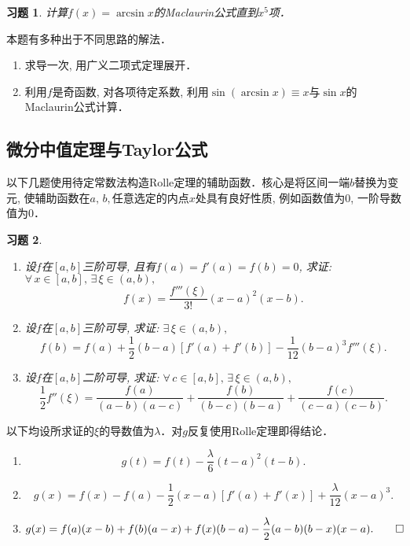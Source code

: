 \documentclass[11pt,a4paper]{ctexart}
\makeatletter
\theoremstyle{thmseries} %
\theoremstyle{exerseries}
\newtheorem{exer}{习题}[section]
\renewenvironment{proof}[1][\proofname]{\par
  \pushQED{\qed}%
  \normalfont \topsep6\p@\@plus6\p@\relax
  \trivlist
  \item[\hskip\labelsep
        \itshape
    #1\@addpunct{}]\ignorespaces
}{%
  \popQED\endtrivlist\@endpefalse
}
\newenvironment{sol}{\begin{proof}[\bfseries\upshape 解\quad]}{\end{proof}}
\newenvironment{pf}{\begin{proof}[\bfseries\upshape 证\quad]}{\end{proof}}
\newcommand{\sbra}[1]{\mathopen{}\left[#1\right]}
\makeatother
\begin{document}
\begin{exer}
	计算$f(x)=\arcsin x$的Maclaurin公式直到$x^5$项．
\end{exer}
\begin{sol}
	本题有多种出于不同思路的解法．
	\begin{enumerate}
		\item 求导一次, 用广义二项式定理展开．
		\item 利用$f$是奇函数, 对各项待定系数, 利用$\sin(\arcsin x)\equiv x$与$\sin x$的Maclaurin公式计算．\qedhere
	\end{enumerate}
\end{sol}


\subsection{微分中值定理与Taylor公式}
以下几题使用待定常数法构造Rolle定理的辅助函数．核心是将区间一端$b$替换为变元, 使辅助函数在$a,\,b,$任意选定的内点$x$处具有良好性质, 例如函数值为0, 一阶导数值为0．
\begin{exer}
	\phantom{text}
	\begin{enumerate}
		\item 设$f$在$[a,b]$三阶可导, 且有$f(a)=f'(a)=f(b)=0$, 求证: $\forall\,x\in[a,b],\,\exists\,\xi\in(a,b),$
		\[f(x)=\frac{f'''(\xi)}{3!}(x-a)^2(x-b).\]
		\item 设$f$在$[a,b]$三阶可导, 求证: $\exists\,\xi\in(a,b),$
		\[f(b)=f(a)+\frac{1}{2}(b-a)[f'(a)+f'(b)]-\frac{1}{12}(b-a)^3f'''(\xi).\]
		\item 设$f$在$[a,b]$二阶可导, 求证: $\forall\,c\in[a,b],\,\exists\,\xi\in(a,b),$
		\[\frac{1}{2}f''(\xi)=\frac{f(a)}{(a-b)(a-c)}+\frac{f(b)}{(b-c)(b-a)}+\frac{f(c)}{(c-a)(c-b)}.\]
	\end{enumerate}
\end{exer}
\begin{pf}
	以下均设所求证的$\xi$的导数值为$\lambda$．对$g$反复使用Rolle定理即得结论．
	\begin{enumerate}
		\item \[g(t)=f(t)-\frac{\lambda}{6}(t-a)^2(t-b).\]
		\item \[g(x)=f(x)-f(a)-\frac{1}{2}(x-a)\sbra{f'(a)+f'(x)}+\frac{\lambda}{12}(x-a)^3.\]
		\item \[g(x)=f(a)(x-b)+f(b)(a-x)+f(x)(b-a)-\frac{\lambda}{2}(a-b)(b-x)(x-a).\qedhere\]
	\end{enumerate}
\end{pf}
\end{document}
